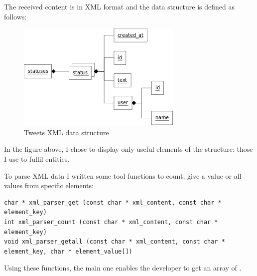 The received content is in XML format and the data structure is defined as follows:

\begin{figure}[h]
  \centering
  \includegraphics[scale=0.75]{images/xml.png}
  \caption{Tweets XML data structure}
\end{figure}
In the figure above, I chose to display only useful elements of the structure: those I use to fulfil  entities.

To parse XML data I written some tool functions to count, give a value or all values from specific elements:
\begin{lstlisting}
char * xml_parser_get (const char * xml_content, const char * element_key)
int xml_parser_count (const char * xml_content, const char * element_key)
void xml_parser_getall (const char * xml_content, const char * element_key, char * element_value[])
\end{lstlisting}

Using these functions, the main one enables the developer to get an array of .

\clearpage